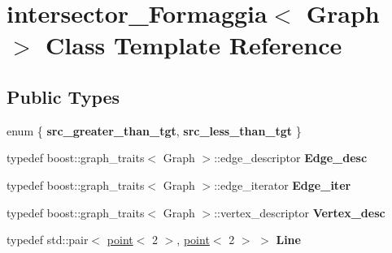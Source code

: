 \hypertarget{classintersector__Formaggia}{
\section{intersector\_\-Formaggia$<$ Graph $>$ Class Template Reference}
\label{classintersector__Formaggia}
}
\subsection*{Public Types}
\begin{DoxyCompactItemize}
\item 
enum \{ {\bfseries src\_\-greater\_\-than\_\-tgt}, 
{\bfseries src\_\-less\_\-than\_\-tgt}
 \}
\item 
\hypertarget{classintersector__Formaggia_a58d18500454d1f357f750a4ee527ad15}{
typedef boost::graph\_\-traits$<$ Graph $>$::edge\_\-descriptor {\bfseries Edge\_\-desc}}
\label{classintersector__Formaggia_a58d18500454d1f357f750a4ee527ad15}

\item 
\hypertarget{classintersector__Formaggia_aa6ea1ec6783d4c5755c781756162f90d}{
typedef boost::graph\_\-traits$<$ Graph $>$::edge\_\-iterator {\bfseries Edge\_\-iter}}
\label{classintersector__Formaggia_aa6ea1ec6783d4c5755c781756162f90d}

\item 
\hypertarget{classintersector__Formaggia_a706063329b7f1d43016f1a01fb8a104b}{
typedef boost::graph\_\-traits$<$ Graph $>$::vertex\_\-descriptor {\bfseries Vertex\_\-desc}}
\label{classintersector__Formaggia_a706063329b7f1d43016f1a01fb8a104b}

\item 
\hypertarget{classintersector__Formaggia_a9015b064ae0c4f9b372dfc296e0fe012}{
typedef std::pair$<$ \hyperlink{classpoint}{point}$<$ 2 $>$, \hyperlink{classpoint}{point}$<$ 2 $>$ $>$ {\bfseries Line}}
\label{classintersector__Formaggia_a9015b064ae0c4f9b372dfc296e0fe012}

\end{DoxyCompactItemize}
